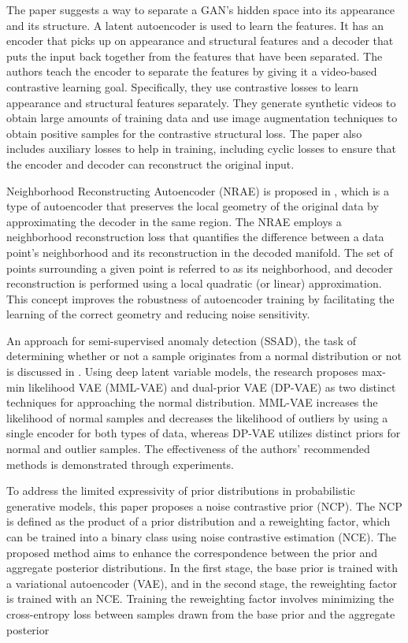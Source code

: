 The paper \cite{duarte2022contrastive} suggests a way to separate a GAN's hidden space into its appearance and its structure. A latent autoencoder is used to learn the features. It has an encoder that picks up on appearance and structural features and a decoder that puts the input back together from the features that have been separated. The authors teach the encoder to separate the features by giving it a video-based contrastive learning goal. Specifically, they use contrastive losses to learn appearance and structural features separately. They generate synthetic videos to obtain large amounts of training data and use image augmentation techniques to obtain positive samples for the contrastive structural loss. The paper also includes auxiliary losses to help in training, including cyclic losses to ensure that the encoder and decoder can reconstruct the original input.

Neighborhood Reconstructing Autoencoder (NRAE) is proposed in \cite{lee2021neighborhood}, which is a type of autoencoder that preserves the local geometry of the original data by approximating the decoder in the same region. The NRAE employs a neighborhood reconstruction loss that quantifies the difference between a data point's neighborhood and its reconstruction in the decoded manifold. The set of points surrounding a given point is referred to as its neighborhood, and decoder reconstruction is performed using a local quadratic (or linear) approximation. This concept improves the robustness of autoencoder training by facilitating the learning of the correct geometry and reducing noise sensitivity.

An approach for semi-supervised anomaly detection (SSAD), the task of determining whether or not a sample originates from a normal distribution or not is discussed in \cite{daniel2021deep}. Using deep latent variable models, the research proposes max-min likelihood VAE (MML-VAE) and dual-prior VAE (DP-VAE) as two distinct techniques for approaching the normal distribution. MML-VAE increases the likelihood of normal samples and decreases the likelihood of outliers by using a single encoder for both types of data, whereas DP-VAE utilizes distinct priors for normal and outlier samples. The effectiveness of the authors' recommended methods is demonstrated through experiments.

To address the limited expressivity of prior distributions in probabilistic generative models, this paper \cite{aneja2021a} proposes a noise contrastive prior (NCP). The NCP is defined as the product of a prior distribution and a reweighting factor, which can be trained into a binary class using noise contrastive estimation (NCE). The proposed method aims to enhance the correspondence between the prior and aggregate posterior distributions. In the first stage, the base prior is trained with a variational autoencoder (VAE), and in the second stage, the reweighting factor is trained with an NCE. Training the reweighting factor involves minimizing the cross-entropy loss between samples drawn from the base prior and the aggregate posterior